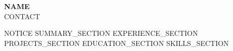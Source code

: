 \documentclass[letterpaper,10pt]{article}
\begin{document}
\begin{center}
{\LARGE\bfseries {{NAME}}}\\
{{CONTACT}}
\end{center}
{{NOTICE}}
{{SUMMARY_SECTION}}
{{EXPERIENCE_SECTION}}
{{PROJECTS_SECTION}}
{{EDUCATION_SECTION}}
{{SKILLS_SECTION}}
\end{document}
